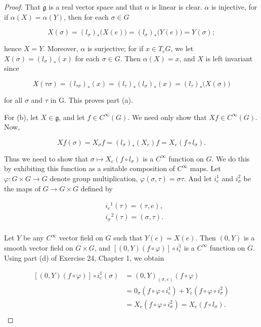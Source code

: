 \begin{proof}
That $\mathfrak{g}$ is a real vector space and that $\alpha$ is linear is clear. $\alpha$ is injective, for if $\alpha(X) = \alpha(Y)$, then for each $\sigma \in G$

\begin{equation}
\tag{1}\label{eq:3.7:1}
X(\sigma)=(l_{\sigma})_{*}\big(X(e)\big)=(l_{\sigma})_{*}\big(Y(e)\big)=Y(\sigma);
\end{equation}

hence $X = Y$. Moreover, $\alpha$ is surjective; for if $x \in T_{e} G$, we let $X(\sigma) = (l_{\sigma})_{*}(x)$ for each $\sigma \in G$. Then $\alpha(X) = x$, and $X$ is left invariant since

\[
X(\tau\sigma)=(l_{\tau\sigma})_{*}(x)=(l_{\tau})_{*}(l_{\sigma})_{*}(x)=(l_{\tau})_{*}\big(X(\sigma)\big)
\]

for all  $ \sigma $ and  $ \tau $ in G. This proves part (a).

For (b), let  $ X \in \mathfrak{g} $, and let  $ f \in C^\infty(G) $. We need only show that  $ X f \in C^\infty(G) $. Now,

\begin{equation}
\tag{2}\label{eq:3.7:2}
X f(\sigma)=X_{\sigma}f=(l_{\sigma})_{*}(X_{e})f=X_{e}(f\circ l_{\sigma}).
\end{equation}

Thus we need to show that $\sigma \mapsto X_e(f \circ l_\sigma)$ is a $C^\infty$ function on $G$. We do this by exhibiting this function as a suitable composition of $C^\infty$ maps. Let $\varphi: G \times G \to G$ denote group multiplication, $\varphi(\sigma, \tau) = \sigma\tau$. And let $i_e^1$ and $i_\sigma^2$ be the maps of $G \to G \times G$ defined by

\begin{equation}
\tag{3}\label{eq:3.7:3}
\begin{aligned}{}&{{}i_{e}{}^{1}(\tau)=(\tau,e),}\\ {}&{{}i_{\sigma}{}^{2}(\tau)=(\sigma,\tau).}\\ \end{aligned}
\end{equation}

Let $Y$ be any $C^\infty$ vector field on $G$ such that $Y(e) = X(e)$. Then $(0,Y)$ is a smooth vector field on $G \times G$, and $[(0,Y)(f \circ \varphi)] \circ i_e^1$ is a $C^\infty$ function on $G$. Using part (d) of Exercise 24, Chapter 1, we obtain

\[
\begin{aligned}{[(0,Y)(f\circ\varphi)]\circ i_{e}^{1}(\sigma)}&{{}=(0,Y)_{(\sigma,e)}(f\circ\varphi)}\\ {}&{{}=0_{\sigma}(f\circ\varphi\circ i_{e}^{1})+Y_{e}(f\circ\varphi\circ i_{\sigma}^{2})}\\ {}&{{}=X_{e}(f\circ\varphi\circ i_{\sigma}^{2})=X_{e}(f\circ l_{\sigma}).}\\ \end{aligned}
\]


\end{proof}
